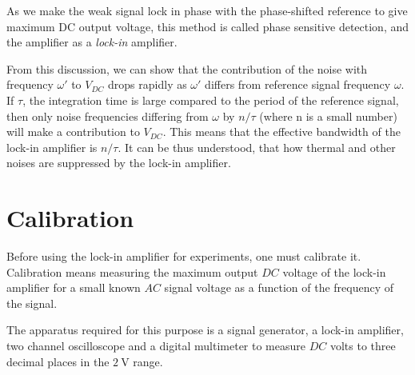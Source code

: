 \documentclass[%
 reprint,
nofootinbib,
 amsmath,amssymb,
 aps,
]{revtex4-2}
\begin{document}
    \par
    As we make the weak signal lock in phase with the phase-shifted reference to give maximum DC output voltage, this method is called phase sensitive detection, and the amplifier as a \textit{lock-in} amplifier.
    \par
    From this discussion, we can show that the contribution of the noise with frequency $\omega'$ to $V_{DC}$ drops rapidly as $\omega'$ differs from reference signal frequency $\omega$. If $\tau$, the integration time is large compared to the period of the reference signal, then only noise frequencies differing from $\omega$ by $n/\tau$ (where n is a small number) will make a contribution to $V_{DC}$. This means that the effective bandwidth of the lock-in amplifier is  $n/\tau$. It can be thus understood, that how thermal and other noises are suppressed by the lock-in amplifier.
    
\section{\label{sec:calib}Calibration}
    Before using the lock-in amplifier for experiments, one must calibrate it. Calibration means measuring the maximum output $DC$ voltage of the lock-in amplifier for a small known $AC$ signal voltage as a function of the frequency of the signal.
    \par
    The apparatus required for this purpose is a signal generator, a lock-in amplifier, two channel oscilloscope and a digital multimeter to measure $DC$ volts to three decimal places in the $\SI{2}{\volt}$ range. 
\end{document}
